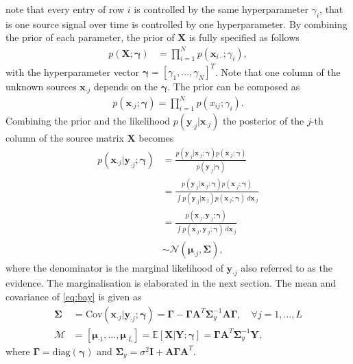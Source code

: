 note that every entry of row $i$ is controlled by the same hyperparameter $\gamma_i$, that is one source signal over time is controlled by one hyperparameter. 
By combining the prior of each parameter, the prior of $\textbf{X}$ is fully specified as follows 
\begin{align*}
p (\mathbf{X} ; \boldsymbol{\gamma}) &= \prod_{i=1}^N p (\mathbf{x}_{i \cdot} ; \gamma_i),
\end{align*}
with the hyperparameter vector $\boldsymbol{\gamma} = [\gamma_1, \dots, \gamma_N]^T$. Note that one column of the unknown sources $\textbf{x}_{\cdot j}$ depends on the $\boldsymbol{\gamma}$. The prior can be composed as 
\begin{align*}
p\left(\textbf{x}_{\cdot j};\boldsymbol{\gamma}\right) = \prod_{i=1}^{N}p\left( x_{ij};\gamma_{i}\right).
\end{align*} 
Combining the prior and the likelihood $p(\mathbf{y}_{\cdot j} \vert \mathbf{x}_{\cdot j})$  the posterior of the $j$-th column of the source matrix $\mathbf{X}$ becomes
\begin{align}
p(\mathbf{x}_{\cdot j} \vert \mathbf{y}_{\cdot j} ; \boldsymbol{\gamma}) &= \frac{p(\mathbf{y}_{\cdot j} | \mathbf{x}_{\cdot j} ; \boldsymbol{\gamma}) p(\mathbf{x}_{\cdot j} ; \boldsymbol{\gamma})}{p(\mathbf{y}_{\cdot j} | \boldsymbol{\gamma})} \nonumber \\
&= \frac{p(\mathbf{y}_{\cdot j} | \mathbf{x}_{\cdot j} ; \boldsymbol{\gamma}) p(\mathbf{x}_{\cdot j} ; \boldsymbol{\gamma})}{\int p(\mathbf{y}_{\cdot j} | \mathbf{x}_{\cdot j}) p(\mathbf{x}_{\cdot j} ; \boldsymbol{\gamma}) \ d \mathbf{x}_{\cdot j}} \nonumber \\ 
&= \frac{p(\mathbf{x}_{\cdot j}, \mathbf{y}_{\cdot j} ; \boldsymbol{\gamma})}{\int p(\mathbf{x}_{\cdot j}, \mathbf{y}_{\cdot j} ; \boldsymbol{\gamma}) \ d \mathbf{x}_{\cdot j}} \nonumber \\ 
&\sim \mathcal{N}(\boldsymbol{\mu}_{\cdot j}, \boldsymbol{\Sigma}),\label{eq:bay}
\end{align}
where the denominator is the marginal likelihood of $\mathbf{y}_{\cdot j}$ also referred to as the evidence. The marginalisation is elaborated in the next section. The mean and covariance of \eqref{eq:bay} is given as
\begin{align}
\boldsymbol{\Sigma} &= \text{Cov}(\mathbf{x}_{\cdot j} \vert \mathbf{y}_{\cdot j} ; \boldsymbol{\gamma}) = \boldsymbol{\Gamma} - \boldsymbol{\Gamma} \mathbf{A}^T \boldsymbol{\Sigma}_y^{-1} \mathbf{A} \boldsymbol{\Gamma}, \quad \forall j = 1, \dots, L \label{eq:moments1} \\
\mathcal{M} &= [\boldsymbol{\mu}_{\cdot 1}, \dots, \boldsymbol{\mu}_{\cdot L}] = \mathbb{E}[\mathbf{X} \vert \mathbf{Y} ; \boldsymbol{\gamma}] = \boldsymbol{\Gamma} \mathbf{A}^T \boldsymbol{\Sigma}_y^{-1} \mathbf{Y}, \label{eq:moments2} 
\end{align}
where $\boldsymbol{\Gamma} = \text{diag}(\boldsymbol{\gamma})$ and $\boldsymbol{\Sigma}_y = \sigma^2 \mathbf{I} + \mathbf{A} \boldsymbol{\Gamma} \mathbf{A}^T$. 

